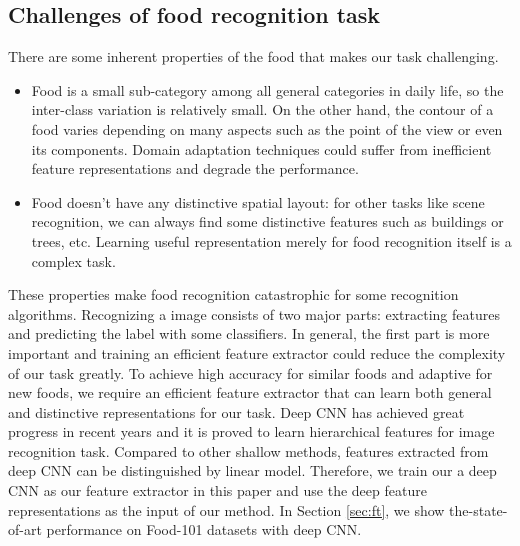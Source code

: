 \subsection{Challenges of food recognition task}
There are some inherent properties of the food that makes our task challenging.
\begin{itemize}
 \item Food is a small sub-category among all general categories in daily life, so the inter-class variation is relatively small. On the other hand, the contour of a food varies depending on many aspects such as the point of the view or even its components. Domain adaptation techniques could suffer from inefficient feature representations and degrade the performance.
  \item Food doesn't have any distinctive spatial layout: for other tasks like scene recognition, we can always find some distinctive features such as buildings or trees, etc. Learning useful representation merely for food recognition itself is a complex task.
\end{itemize}
These properties make food recognition catastrophic for some recognition algorithms. Recognizing a image consists of two major parts: extracting features and predicting the label with some classifiers. In general, the first part is more important and training an efficient feature extractor could reduce the complexity of our task greatly. To achieve high accuracy for similar foods and adaptive for new foods, we require an efficient feature extractor that can learn both general and distinctive representations for our task. Deep CNN has achieved great progress in recent years and it is proved to learn hierarchical features for image recognition task\cite{zeiler2010deconvolutional}\cite{krizhevsky2012imagenet}\cite{CiresanIJCAI11}. Compared to other shallow methods, features extracted from deep CNN can be distinguished by linear model. Therefore, we train our a deep CNN as our feature extractor in this paper and use the deep feature representations as the input of our method. In Section \ref{sec:ft}, we show the-state-of-art performance on Food-101 datasets with deep CNN.

